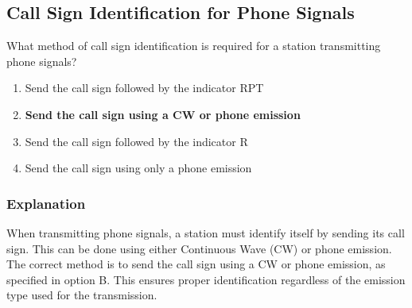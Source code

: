 \subsection{Call Sign Identification for Phone Signals}
\label{T1F05}

\begin{tcolorbox}[colback=gray!10!white,colframe=black!75!black,title=T1F05]
What method of call sign identification is required for a station transmitting phone signals?
\begin{enumerate}[label=\Alph*),noitemsep]
    \item Send the call sign followed by the indicator RPT
    \item \textbf{Send the call sign using a CW or phone emission}
    \item Send the call sign followed by the indicator R
    \item Send the call sign using only a phone emission
\end{enumerate}
\end{tcolorbox}

\subsubsection*{Explanation}
When transmitting phone signals, a station must identify itself by sending its call sign. This can be done using either Continuous Wave (CW) or phone emission. The correct method is to send the call sign using a CW or phone emission, as specified in option B. This ensures proper identification regardless of the emission type used for the transmission.